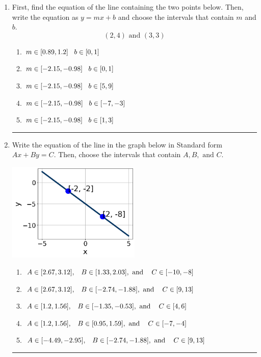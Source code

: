 \documentclass[14pt]{extbook}
\newcommand{\litem}[1]{\item#1\hspace*{-1cm}\rule{\textwidth}{0.4pt}}
\begin{document}
\begin{enumerate}
{\begin{enumerate}[label=\Alph*.]
\end{enumerate} }
\litem{
First, find the equation of the line containing the two points below. Then, write the equation as $ y=mx+b $ and choose the intervals that contain $m$ and $b$.\[ (2, 4) \text{ and } (3, 3) \]\begin{enumerate}[label=\Alph*.]
\item \( m \in [0.89, 1.2] \hspace*{3mm} b \in [0, 1] \)
\item \( m \in [-2.15, -0.98] \hspace*{3mm} b \in [0, 1] \)
\item \( m \in [-2.15, -0.98] \hspace*{3mm} b \in [5, 9] \)
\item \( m \in [-2.15, -0.98] \hspace*{3mm} b \in [-7, -3] \)
\item \( m \in [-2.15, -0.98] \hspace*{3mm} b \in [1, 3] \)

\end{enumerate} }
\litem{
Write the equation of the line in the graph below in Standard form $Ax+By=C$. Then, choose the intervals that contain $A, B, \text{ and } C$.
\begin{center}
    \includegraphics[width=0.5\textwidth]{../Figures/linearGraphToStandardC.png}
\end{center}
\begin{enumerate}[label=\Alph*.]
\item \( A \in [2.67, 3.12], \hspace{3mm} B \in [1.33, 2.03], \text{ and } \hspace{3mm} C \in [-10, -8] \)
\item \( A \in [2.67, 3.12], \hspace{3mm} B \in [-2.74, -1.88], \text{ and } \hspace{3mm} C \in [9, 13] \)
\item \( A \in [1.2, 1.56], \hspace{3mm} B \in [-1.35, -0.53], \text{ and } \hspace{3mm} C \in [4, 6] \)
\item \( A \in [1.2, 1.56], \hspace{3mm} B \in [0.95, 1.59], \text{ and } \hspace{3mm} C \in [-7, -4] \)
\item \( A \in [-4.49, -2.95], \hspace{3mm} B \in [-2.74, -1.88], \text{ and } \hspace{3mm} C \in [9, 13] \)

\end{enumerate} }
\end{enumerate}
\end{document}
